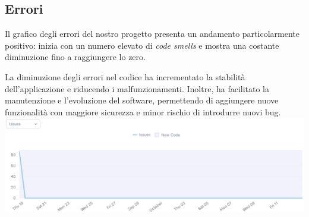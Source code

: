 \subsection*{Errori}
Il grafico degli errori del nostro progetto presenta un andamento particolarmente positivo: inizia con un numero elevato di \textit{code smells} e mostra una costante diminuzione fino a raggiungere lo zero.\par
La diminuzione degli errori nel codice ha incrementato la stabilità dell'applicazione e riducendo i malfunzionamenti. Inoltre, ha facilitato la manutenzione e l'evoluzione del software, permettendo di aggiungere nuove funzionalità con maggiore sicurezza e minor rischio di introdurre nuovi bug.\meskip
\includegraphics[width=\textwidth]{assets/sonarqube/issues.png}